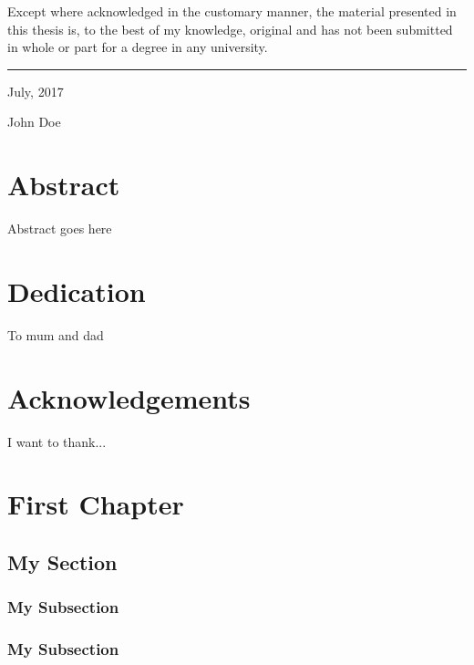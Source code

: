 \documentclass[12pt]{report}
\begin{document}
Except where acknowledged in the customary manner, the material 
presented in this thesis is, to the best of my knowledge, original and 
has not been submitted in whole or part for a degree in any 
university.
\vspace{20mm}  %
\hspace{80mm}\rule{40mm}{.15mm}\par   %
\hspace{80mm} July, 2017\par
\hspace{80mm} John Doe



\chapter*{Abstract}
Abstract goes here

\chapter*{Dedication}
To mum and dad


\chapter*{Acknowledgements}
I want to thank...

\tableofcontents

\chapter{First Chapter}
%
\section{My Section}
\subsection{My Subsection}

\subsection{My Subsection}

\end{document}

